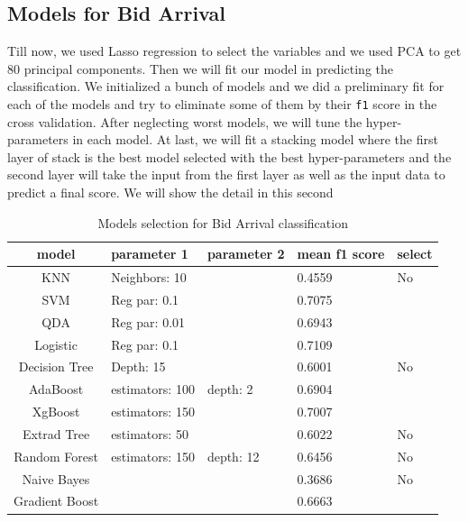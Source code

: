 \documentclass[letterpaper,12pt]{article}
\numberwithin{equation}{section}
\begin{document}
\subsection{Models for Bid Arrival}
Till now, we used Lasso regression to select the variables and we used PCA to get 80 principal components. Then we will fit our model in predicting the classification. We initialized a bunch of models and we did a preliminary fit for each of the models and try to eliminate some of them by their \texttt{f1} score in the cross validation. After neglecting worst models, we will tune the hyper-parameters in each model. At last, we will fit a stacking model where the first layer of stack is the best model selected with the best hyper-parameters and the second layer will take the input from the first layer as well as the input data to predict a final score. We will show the detail in this second

\begin{table}[H]
    \centering
    \begin{tabular}{c |l| l| l| l }
    \hline \hline 
         model & parameter 1 & parameter 2 & mean f1 score & select   \\ \hline 
         KNN          & Neighbors: 10  &          & 0.4559           & No  \\ \hline 
         SVM          & Reg par: 0.1   &          & 0.7075           &\color{red}{Yes}  \\ \hline 
         QDA          & Reg par: 0.01  &          & 0.6943           &\color{red}{Yes}   \\ \hline  
         Logistic     & Reg par: 0.1   &          & 0.7109           &\color{red}{Yes}   \\ \hline 
         Decision Tree& Depth: 15      &          & 0.6001           & No  \\ \hline 
         AdaBoost     & estimators: 100& depth: 2 & 0.6904           &\color{red}{Yes}   \\ \hline 
         XgBoost      & estimators: 150&          & 0.7007           &\color{red}{Yes}   \\ \hline 
         Extrad Tree  & estimators: 50 &          & 0.6022           & No  \\ \hline 
         Random Forest& estimators: 150& depth: 12& 0.6456           & No  \\ \hline 
         Naive Bayes  &                &          & 0.3686           & No  \\ \hline 
         Gradient Boost&               &          & 0.6663           &\color{red}{Yes}   \\ \hline \hline
    \end{tabular}
    \caption{Models selection for Bid Arrival classification}
    \label{sec4:tab:model_select}
\end{table}
\end{document}
